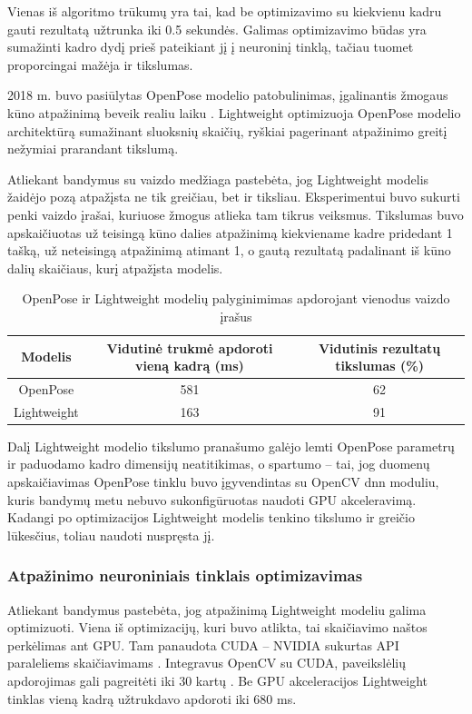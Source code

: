 \documentclass{VUMIFPSbakalaurinis}
\begin{document}
Vienas iš algoritmo trūkumų yra tai, kad be optimizavimo su kiekvienu kadru gauti rezultatą užtrunka iki 0.5 sekundės. Galimas optimizavimo būdas yra sumažinti kadro dydį prieš pateikiant jį į neuroninį tinklą, tačiau tuomet proporcingai mažėja ir tikslumas. 

2018 m. buvo pasiūlytas OpenPose modelio patobulinimas, įgalinantis žmogaus kūno atpažinimą beveik realiu laiku \cite{osokin2018realtime}. Lightweight optimizuoja OpenPose modelio architektūrą sumažinant sluoksnių skaičių, ryškiai pagerinant atpažinimo greitį nežymiai prarandant tikslumą. 

Atliekant bandymus su vaizdo medžiaga pastebėta, jog Lightweight modelis žaidėjo pozą atpažįsta ne tik greičiau, bet ir tiksliau. Eksperimentui buvo sukurti penki vaizdo įrašai, kuriuose žmogus atlieka tam tikrus veiksmus. Tikslumas buvo apskaičiuotas už teisingą kūno dalies atpažinimą kiekviename kadre pridedant 1 tašką, už neteisingą atpažinimą atimant 1, o gautą rezultatą padalinant iš kūno dalių skaičiaus, kurį atpažįsta modelis.

\begin{table}[H]\footnotesize
	\centering
	\caption{OpenPose ir Lightweight modelių palyginimimas apdorojant vienodus vaizdo įrašus}
	{\begin{tabular}{|c|c|c|} \hline
			\textbf{Modelis} & \textbf{Vidutinė trukmė apdoroti vieną kadrą (ms)} & \textbf{Vidutinis rezultatų tikslumas (\%)} \\
			\hline
			OpenPose  & 581    & 62       \\
			\hline
			Lightweight  & 163    & 91       \\
			\hline
	\end{tabular}}
	\label{tab:openposevslightweight}
\end{table}

Dalį Lightweight modelio tikslumo pranašumo galėjo lemti OpenPose parametrų ir paduodamo kadro dimensijų neatitikimas, o spartumo – tai, jog duomenų apskaičiavimas OpenPose tinklu buvo įgyvendintas su OpenCV dnn moduliu, kuris bandymų metu nebuvo sukonfigūruotas naudoti GPU akceleravimą. Kadangi po optimizacijos Lightweight modelis tenkino tikslumo ir greičio lūkesčius, toliau naudoti nuspręsta jį. 

\subsubsection{Atpažinimo neuroniniais tinklais optimizavimas}

Atliekant bandymus pastebėta, jog atpažinimą Lightweight modeliu galima optimizuoti. Viena iš optimizacijų, kuri buvo atlikta, tai skaičiavimo naštos perkėlimas ant GPU. Tam panaudota CUDA – NVIDIA sukurtas API paraleliems skaičiavimams \cite{cuda}. Integravus OpenCV su CUDA, paveikslėlių apdorojimas gali pagreitėti iki 30 kartų \cite{opencv-cuda}. Be GPU akceleracijos Lightweight tinklas vieną kadrą užtrukdavo apdoroti iki 680 ms. 
\end{document}
